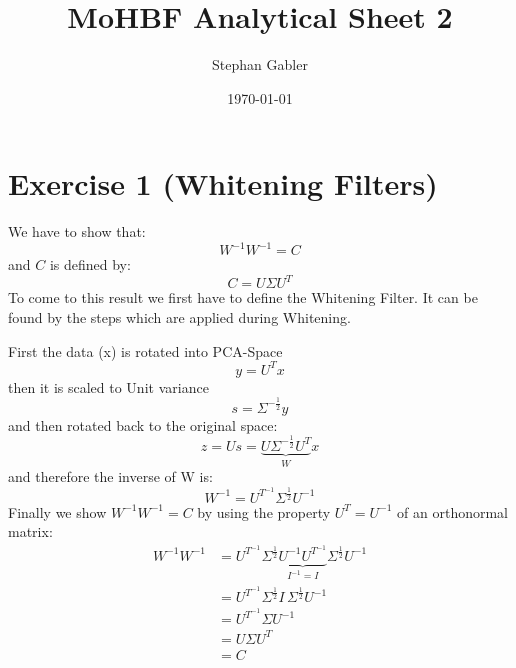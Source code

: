 \documentclass[]{article}
\title{MoHBF Analytical Sheet 2}
\author{Stephan Gabler}
\date{\today}
\begin{document}
\ifpdf
{}
\else
{}
\fi

\maketitle

\section{Exercise 1 (Whitening Filters)} %
\label{sg:sec:exercise_1_whitening_filters_}

We have to show that:
\begin{equation}
	W^{-1} W^{-1} = C
\end{equation}
and $C$ is defined by:
\begin{equation}
	C = U \Sigma U^{T}
\end{equation}
To come to this result we first have to define the Whitening Filter. It can
be found by the steps which are applied during Whitening.

First the data (x) is rotated into PCA-Space
\begin{equation}
	y = U^{T} x
\end{equation}
then it is scaled to Unit variance
\begin{equation}
	s = \Sigma^{-\frac{1}{2}} y
\end{equation}
and then rotated back to the original space:
\begin{equation}
	z = U s = \underbrace{U \Sigma^{-\frac{1}{2}} U^{T}}_{W} x
\end{equation}
and therefore the inverse of W is:
\begin{equation}
	W^{-1} = U^{T^{-1}} \Sigma^{\frac{1}{2}} U^{-1} 
\end{equation}
Finally we show $W^{-1} W^{-1} = C$ by using the property $U^{T} = U^{-1}$ of an orthonormal matrix:
\[
\begin{aligned}
	W^{-1} W^{-1} 
		&= U^{T^{-1}} \Sigma^{\frac{1}{2}} \underbrace{U^{-1} U^{T^{-1}}}_{I^{-1} = I} \Sigma^{\frac{1}{2}} U^{-1}  \\
		&= U^{T^{-1}} \Sigma^{\frac{1}{2}} I\, \Sigma^{\frac{1}{2}} U^{-1} \\
		&= U^{T^{-1}} \Sigma U^{-1} \\
		&= U \Sigma U^{T} \\
		&= C
\end{aligned}	
\]


\end{document}

